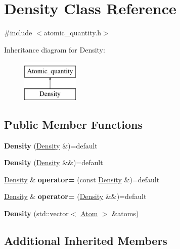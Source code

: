 \hypertarget{classDensity}{}\section{Density Class Reference}
\label{classDensity}


{\ttfamily \#include $<$atomic\+\_\+quantity.\+h$>$}

Inheritance diagram for Density\+:\begin{figure}[H]
\begin{center}
\leavevmode
\includegraphics[height=2.000000cm]{classDensity}
\end{center}
\end{figure}
\subsection*{Public Member Functions}
\begin{DoxyCompactItemize}
\item 
\mbox{\label{classDensity_aa6d4e3c21169b9e4621ce23e7691068f}} 
{\bfseries Density} (\hyperlink{classDensity}{Density} \&)=default
\item 
\mbox{\label{classDensity_aba98ae4c1dc9fbbb40754ccd09cb4f3e}} 
{\bfseries Density} (\hyperlink{classDensity}{Density} \&\&)=default
\item 
\mbox{\label{classDensity_a86dfd88c2a8c52f356ac743e44b0cca9}} 
\hyperlink{classDensity}{Density} \& {\bfseries operator=} (const \hyperlink{classDensity}{Density} \&)=default
\item 
\mbox{\label{classDensity_a6128faad5c75a914d40222844b324a1e}} 
\hyperlink{classDensity}{Density} \& {\bfseries operator=} (\hyperlink{classDensity}{Density} \&\&)=default
\item 
\mbox{\label{classDensity_ae48ea1fc60168a20bc97f20eaef329bb}} 
{\bfseries Density} (std\+::vector$<$ \hyperlink{classAtom}{Atom} $>$ \&atoms)
\end{DoxyCompactItemize}
\subsection*{Additional Inherited Members}


